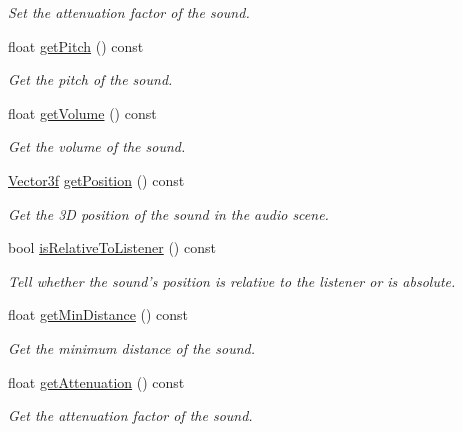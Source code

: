 \begin{DoxyCompactItemize}
\begin{DoxyCompactList}\small\item\em Set the attenuation factor of the sound. \end{DoxyCompactList}\item 
float \hyperlink{classsf_1_1_sound_source_aedad6aff442aeb6dcd267befd4fdbb59}{get\+Pitch} () const 
\begin{DoxyCompactList}\small\item\em Get the pitch of the sound. \end{DoxyCompactList}\item 
float \hyperlink{classsf_1_1_sound_source_aafb0558fce9cbebfc6828d932cbcce2f}{get\+Volume} () const 
\begin{DoxyCompactList}\small\item\em Get the volume of the sound. \end{DoxyCompactList}\item 
\hyperlink{classsf_1_1_vector3}{Vector3f} \hyperlink{classsf_1_1_sound_source_a4c3bc60286f488aaf2941ab76476eebc}{get\+Position} () const 
\begin{DoxyCompactList}\small\item\em Get the 3\+D position of the sound in the audio scene. \end{DoxyCompactList}\item 
bool \hyperlink{classsf_1_1_sound_source_a5cb9107e1c47f65ab82c4885436061ef}{is\+Relative\+To\+Listener} () const 
\begin{DoxyCompactList}\small\item\em Tell whether the sound's position is relative to the listener or is absolute. \end{DoxyCompactList}\item 
float \hyperlink{classsf_1_1_sound_source_a3379b9f7a0f0e31ab9a4e5fa1762986e}{get\+Min\+Distance} () const 
\begin{DoxyCompactList}\small\item\em Get the minimum distance of the sound. \end{DoxyCompactList}\item 
float \hyperlink{classsf_1_1_sound_source_ac5f5ffef8930bb573f43d47cbc779bf6}{get\+Attenuation} () const 
\begin{DoxyCompactList}\small\item\em Get the attenuation factor of the sound. \end{DoxyCompactList}\end{DoxyCompactItemize}
